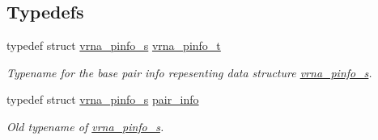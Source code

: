 \subsection*{Typedefs}
\begin{DoxyCompactItemize}
\item 
\mbox{\label{group__aln__utils_ga6660dfca23debee7306e0cd53341263f}} 
typedef struct \hyperlink{group__aln__utils_structvrna__pinfo__s}{vrna\+\_\+pinfo\+\_\+s} \hyperlink{group__aln__utils_ga6660dfca23debee7306e0cd53341263f}{vrna\+\_\+pinfo\+\_\+t}
\begin{DoxyCompactList}\small\item\em Typename for the base pair info repesenting data structure \hyperlink{group__aln__utils_structvrna__pinfo__s}{vrna\+\_\+pinfo\+\_\+s}. \end{DoxyCompactList}\item 
typedef struct \hyperlink{group__aln__utils_structvrna__pinfo__s}{vrna\+\_\+pinfo\+\_\+s} \hyperlink{group__aln__utils_ga7b61662a793ad0aa1ea38efc3a5baacc}{pair\+\_\+info}
\begin{DoxyCompactList}\small\item\em Old typename of \hyperlink{group__aln__utils_structvrna__pinfo__s}{vrna\+\_\+pinfo\+\_\+s}. \end{DoxyCompactList}\end{DoxyCompactItemize}
